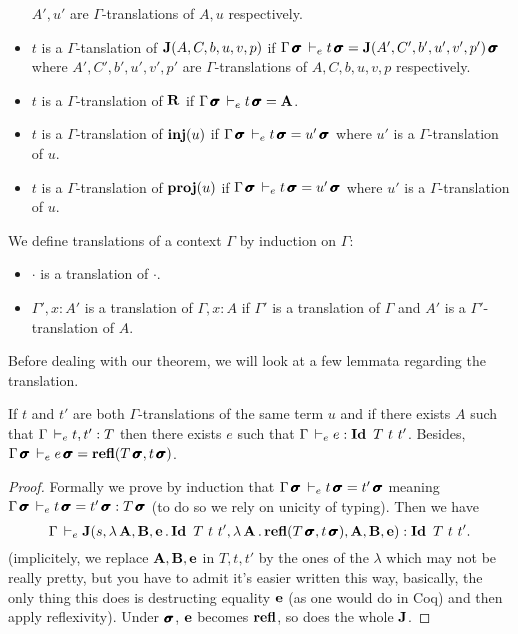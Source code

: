 \documentclass[a4paper,english]{lipics-utf8x}
\begin{document}
\begin{definition}
\begin{itemize}
            $A',u'$ are $\Gamma$-translations of $A,u$ respectively.
      \item \sloppy
            $t$ is a $\Gamma$-tanslation of $\operatorname{\mathbf{J}}(A,C,b,u,v,p)$ if
            $\Gamma \operatorname{\pmb{\bm{\sigma}}} \,\vdash_e t \operatorname{\pmb{\bm{\sigma}}} = \operatorname{\mathbf{J}}(A',C',b',u',v',p')\operatorname{\pmb{\bm{\sigma}}}$
            where $A',C',b',u',v',p'$ are $\Gamma$-translations of
            $A,C,b,u,v,p$ respectively.
      \item $t$ is a $\Gamma$-translation of $\operatorname{\mathbf{R}}$ if
            $\Gamma \operatorname{\pmb{\bm{\sigma}}} \,\vdash_e t \operatorname{\pmb{\bm{\sigma}}} = \operatorname{\mathbf{A}}$.
      \item $t$ is a $\Gamma$-translation of $\operatorname{\mathbf{inj}}(u)$ if
            $\Gamma \operatorname{\pmb{\bm{\sigma}}} \,\vdash_e t \operatorname{\pmb{\bm{\sigma}}} = u'\operatorname{\pmb{\bm{\sigma}}}$ where $u'$ is a
            $\Gamma$-translation of $u$.
      \item $t$ is a $\Gamma$-translation of $\operatorname{\mathbf{proj}}(u)$ if
            $\Gamma \operatorname{\pmb{\bm{\sigma}}} \,\vdash_e t \operatorname{\pmb{\bm{\sigma}}} = u'\operatorname{\pmb{\bm{\sigma}}}$ where $u'$ is a
            $\Gamma$-translation of $u$.
    \end{itemize}
  \end{definition}

  \begin{definition}
    We define translations of a context $\Gamma$ by induction on $\Gamma$:
    \begin{itemize}
      \item $\cdot$ is a translation of $\cdot$.
      \item $\Gamma', x:A'$ is a translation of $\Gamma, x:A$ if $\Gamma'$ is
            a translation of $\Gamma$ and $A'$ is a $\Gamma'$-translation of
            $A$.
    \end{itemize}
  \end{definition}
  Before dealing with our theorem, we will look at a few lemmata regarding the
  translation.

  \begin{lemma}
    \label{lem:transleq}
    If $t$ and $t'$ are both $\Gamma$-translations of the same term $u$ and if
    there exists $A$ such that $\Gamma \,\vdash_e t, t' : T$ then there exists $e$
    such that $\Gamma \dere e : \Id T\ t\ t'$.
    Besides, $\Gamma \operatorname{\pmb{\bm{\sigma}}} \,\vdash_e e \operatorname{\pmb{\bm{\sigma}}} = \operatorname{\mathbf{refl}}(T\operatorname{\pmb{\bm{\sigma}}},t\operatorname{\pmb{\bm{\sigma}}})$.
  \end{lemma}

  \begin{proof}
    Formally we prove by induction that
    $\Gamma \operatorname{\pmb{\bm{\sigma}}} \,\vdash_e t \operatorname{\pmb{\bm{\sigma}}} = t' \operatorname{\pmb{\bm{\sigma}}}$
    meaning $\Gamma \operatorname{\pmb{\bm{\sigma}}} \,\vdash_e t \operatorname{\pmb{\bm{\sigma}}} = t' \operatorname{\pmb{\bm{\sigma}}} : T\operatorname{\pmb{\bm{\sigma}}}$
    (to do so we rely on unicity of typing).
    Then we have
    \[\Gamma \dere \J(s,\lambda \mA, \mB, \me. \Id T\ t\ t',
    \lambda \mA. \refl(T\msigma,t\msigma),\mA,\mB,\me) : \Id T\ t\ t'.\]
    (implicitely, we replace $\operatorname{\mathbf{A}},\operatorname{\mathbf{B}},\operatorname{\mathbf{e}}$ in $T,t,t'$ by the ones of the
    $\lambda$ which may not be really pretty, but you have to admit it's easier
    written this way, basically, the only thing this does is destructing
    equality $\operatorname{\mathbf{e}}$ (as one would do in Coq) and then apply reflexivity).
    Under $\operatorname{\pmb{\bm{\sigma}}}$, $\operatorname{\mathbf{e}}$ becomes $\operatorname{\mathbf{refl}}$, so does the whole $\operatorname{\mathbf{J}}$.
  \end{proof}
\end{document}

